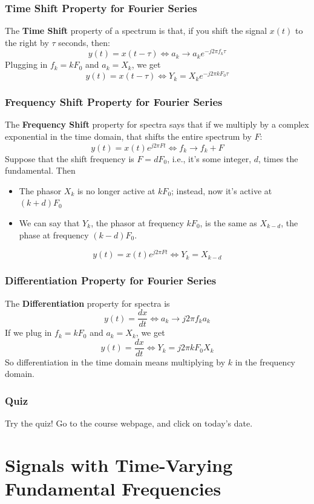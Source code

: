 \documentclass{beamer}
\begin{document}
\begin{frame}
  \frametitle{Time Shift Property for Fourier Series}

  The {\bf Time Shift} property of a spectrum is that, if you shift
  the signal $x(t)$ to the right by $\tau$ seconds, then:
  \[
  y(t)=x(t-\tau)\Leftrightarrow a_k\rightarrow a_k e^{-j2\pi f_k\tau}
  \]
  Plugging in $f_k=kF_0$ and $a_k=X_k$, we get
  \[
  y(t)=x(t-\tau)\Leftrightarrow Y_k= X_k e^{-j2\pi kF_0\tau}
  \]
\end{frame}

\begin{frame}
  \frametitle{Frequency Shift Property for Fourier Series}

  The {\bf Frequency Shift} property for spectra says that if we
  multiply by a complex exponential in the time domain, that shifts
  the entire spectrum by $F$:
  \[
  y(t)=x(t)e^{j2\pi Ft} \Leftrightarrow f_k\rightarrow f_k+F
  \]
  Suppose that the shift frequency is $F=dF_0$, i.e., it's
  some integer, $d$, times the fundamental.
  Then
  \begin{itemize}
  \item The phasor $X_k$ is no longer active at $kF_0$;
    instead, now it's active at $(k+d)F_0$
  \item We can say that $Y_k$, the phasor at frequency $kF_0$, is
    the same as $X_{k-d}$, the phase at frequency $(k-d)F_0$.
  \end{itemize}
  \[
  y(t)=x(t)e^{j2\pi Ft} \Leftrightarrow Y_{k} = X_{k-d}
  \]
\end{frame}
\begin{frame}
  \frametitle{Differentiation Property for Fourier Series}
  The {\bf Differentiation} property for spectra is
  \[
  y(t) = \frac{dx}{dt} \Leftrightarrow a_k\rightarrow j2\pi f_k a_k
  \]
  If we plug in $f_k=kF_0$ and $a_k=X_k$, we get
  \[
  y(t) = \frac{dx}{dt} \Leftrightarrow Y_k= j2\pi kF_0 X_k
  \]
  So differentiation in the time domain means multiplying by $k$ in
  the frequency domain.
\end{frame}  

\begin{frame}
  \frametitle{Quiz}

  Try the quiz! Go to the course webpage, and click on today's date.
\end{frame}

\section[Time-Varying]{Signals with Time-Varying Fundamental Frequencies}
\setcounter{subsection}{1}
\end{document}
